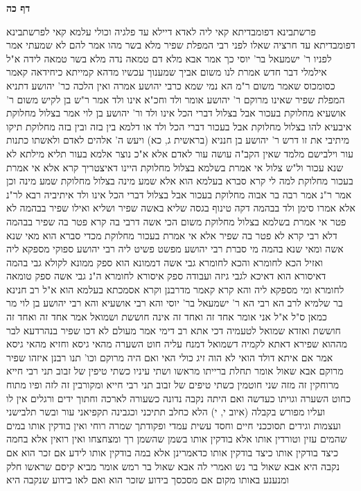 \documentclass[12pt, openany]{book}
\newcommand{\sethebfont}{
\fontsize{10.5pt}{21.0pt} \selectfont
}
\newcommand{\twocol}[1]{
	{\sethebfont \begin{multicols}{2}
			#1
	\end{multicols}}	
}
\newcommand{\sectname}{}
\newcommand{\newsection}[1]{
	\addcontentsline{toc}{section}{#1}
	\renewcommand{\sectname}{#1}	
	\vspace{-\baselineskip}
	\begin{center}
		\textbf{%
\fontsize{16pt}{16pt}\selectfont
			#1}
	\end{center}
	\vspace{-\baselineskip}
	\nopagebreak
}
\begin{document}
\newsection{דף כה}
\twocol{פרשתבינא דפומבדיתא קאי ליה לאדא דיילא עד פלגיה וכולי עלמא קאי לפרשתבינא דפומבדיתא עד חרציה
שאלו לפני רבי המפלת שפיר מלא בשר מהו אמר להם לא שמעתי 
אמר לפניו ר' ישמעאל בר' יוסי כך אמר אבא מלא דם טמאה נדה מלא בשר טמאה לידה 
א"ל אילמלי דבר חדש אמרת לנו משום אביך שמענוך עכשיו
מדהא קמייתא כיחידאה קאמר כסומכוס שאמר משום ר"מ הא נמי שמא כרבי יהושע אמרה ואין הלכה כר' יהושע 
דתניא המפלת שפיר שאינו מרוקם ר' יהושע אומר ולד וחכ"א אינו ולד 
אמר ר"ש בן לקיש משום ר' אושעיא מחלוקת בעכור אבל בצלול דברי הכל אינו ולד ור' יהושע בן לוי אמר בצלול מחלוקת 
איבעיא להו בצלול מחלוקת אבל בעכור דברי הכל ולד או דלמא בין בזה ובין בזה מחלוקת תיקו 
מיתיבי את זו דרש ר' יהושע בן חנניא (בראשית ג, כא) ויעש ה' אלהים לאדם ולאשתו כתנות עור וילבישם מלמד שאין הקב"ה עושה עור לאדם אלא א"כ נוצר 
אלמא בעור תליא מילתא לא שנא עכור ול"ש צלול 
אי אמרת בשלמא בצלול מחלוקת היינו דאיצטריך קרא אלא אי אמרת בעכור מחלוקת למה לי קרא סברא בעלמא הוא אלא שמע מינה בצלול מחלוקת שמע מינה 
וכן אמר ר"נ אמר רבה בר אבוה מחלוקת בעכור אבל בצלול דברי הכל אינו ולד 
איתיביה רבא לר"נ אלא אמרו סימן ולד בבהמה דקה טינוף בגסה שליא באשה שפיר ושליא
ואילו שפיר בבהמה לא פטר אי אמרת בשלמא בצלול מחלוקת משום הכי 
אשה דרבי בה קרא פטר בה שפיר בבהמה דלא רבי קרא לא פטר בה שפיר 
אלא אי אמרת בעכור מחלוקת מכדי סברא הוא מאי שנא אשה ומאי שנא בהמה 
מי סברת רבי יהושע מפשט פשיט ליה רבי יהושע ספוקי מספקא ליה ואזיל הכא לחומרא והכא לחומרא 
גבי אשה דממונא הוא ספק ממונא לקולא 
גבי בהמה דאיסורא הוא דאיכא לגבי גיזה ועבודה ספק איסורא לחומרא ה"נ גבי אשה ספק טומאה לחומרא 
ומי מספקא ליה והא קרא קאמר מדרבנן וקרא אסמכתא בעלמא הוא 
א"ל רב חנינא בר שלמיא לרב הא רבי הא ר' ישמעאל בר' יוסי והא רבי אושעיא והא רבי יהושע בן לוי מר כמאן ס"ל 
א"ל אני אומר אחד זה ואחד זה אינה חוששת 
ושמואל אמר אחד זה ואחד זה חוששת ואזדא שמואל לטעמיה דכי אתא רב דימי אמר מעולם לא דכו שפיר בנהרדעא לבר מההוא שפירא דאתא לקמיה דשמואל דמנח עליה חוט השערה מהאי גיסא וחזיא מהאי גיסא אמר אם איתא דולד הואי לא הוה זיג כולי האי
ואם היה מרוקם וכו' תנו רבנן איזהו שפיר מרוקם אבא שאול אומר תחלת ברייתו מראשו ושתי עיניו כשתי טיפין של זבוב תני רבי חייא מרוחקין זה מזה שני חוטמין כשתי טיפים של זבוב 
תני רבי חייא ומקורבין זה לזה ופיו מתוח כחוט השערה וגויתו כעדשה ואם היתה נקבה נדונה כשעורה לארכה 
וחתוך ידים ורגלים אין לו ועליו מפורש בקבלה (איוב י, י) הלא כחלב תתיכני וכגבינה תקפיאני עור ובשר תלבישני ועצמות וגידים תסוככני חיים וחסד עשית עמדי ופקודתך שמרה רוחי 
ואין בודקין אותו במים שהמים עזין
וטורדין אותו אלא בודקין אותו בשמן שהשמן רך ומצחצחו ואין רואין אלא בחמה 
כיצד בודקין אותו כיצד בודקין אותו כדאמרינן אלא במה בודקין אותו לידע אם זכר הוא אם נקבה היא 
אבא שאול בר נש ואמרי לה אבא שאול בר רמש אומר מביא קיסם שראשו חלק ומנענע באותו מקום אם מסכסך בידוע שזכר הוא ואם לאו בידוע שנקבה היא 
}
\end{document}
